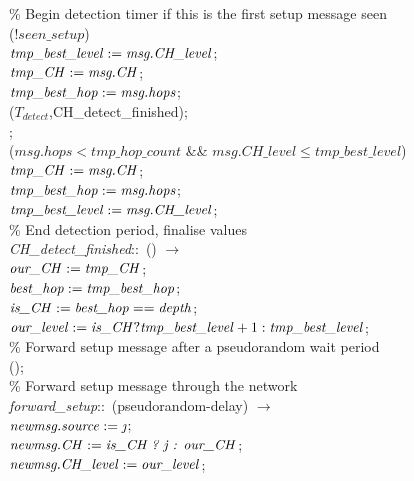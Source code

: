 \begin{figure}[H]
\begin{boxedminipage}{\linewidth}
    \null\qq\qq \% Begin detection timer if this is the first setup message seen\\
    \null\qq\qq {} (!$seen\_setup$)  \\
    \null\qq\qq\qq $\mbox{\emph{tmp\_best\_level}} \mathrel{:=} \mbox{\emph{msg.CH\_level}}$;\\
    \null\qq\qq\qq $\mbox{\emph{tmp\_CH}} \mathrel{:=} \mbox{\emph{msg.CH}}$;\\
    \null\qq\qq\qq $\mbox{\emph{tmp\_best\_hop}} \mathrel{:=} \mbox{\emph{msg.hops}}$;\\
    \null\qq\qq\qq {}($T_{detect}$,CH\_detect\_finished); \\
    \null\qq\qq {}; \\
    \null\qq\qq {} ($msg.hops < tmp\_hop\_count$ \&\& $msg.CH\_level \leq tmp\_best\_level$)  \\
    \null\qq\qq\qq $\mbox{\emph{tmp\_CH}} \mathrel{:=} \mbox{\emph{msg.CH}}$;\\
    \null\qq\qq\qq $\mbox{\emph{tmp\_best\_hop}} \mathrel{:=} \mbox{\emph{msg.hops}}$;\\
    \null\qq\qq\qq $\mbox{\emph{tmp\_best\_level}} \mathrel{:=} \mbox{\emph{msg.CH\_level}}$;\\
    \null\qq \% End detection period, finalise values\\
    \null\qq \emph{CH\_detect\_finished}::~() $\rightarrow$\\
    \null\qq\qq $\mbox{\emph{our\_CH}} \mathrel{:=} \mbox{\emph{tmp\_CH}}$;\\
    \null\qq\qq $\mbox{\emph{best\_hop}} \mathrel{:=} \mbox{\emph{tmp\_best\_hop}}$;\\
    \null\qq\qq $\mbox{\emph{is\_CH}} \mathrel{:=} \mbox{\emph{best\_hop}} == \mbox{\emph{depth}}$;\\
    \null\qq\qq $\mbox{\emph{our\_level}} \mathrel{:=} \mbox{\emph{is\_CH}}? \mbox{\emph{tmp\_best\_level}} + 1 : \mbox{\emph{tmp\_best\_level}}$;\\
    \null\qq\qq \% Forward setup message after a pseudorandom wait period\\
    \null\qq\qq {}();\\
    \null\qq \% Forward setup message through the network\\
    \null\qq \emph{forward\_setup}::~(pseudorandom-delay) $\rightarrow$\\
    \null\qq\qq $\var{newmsg.source} \assign \var{\j}$;\\
    \null\qq\qq $\mbox{\emph{newmsg.CH}} \mathrel{:=} \mbox{\emph{is\_CH ? j : our\_CH}}$;\\
    \null\qq\qq $\mbox{\emph{newmsg.CH\_level}} \mathrel{:=} \mbox{\emph{our\_level}}$;\\

\end{boxedminipage}
\end{figure}
